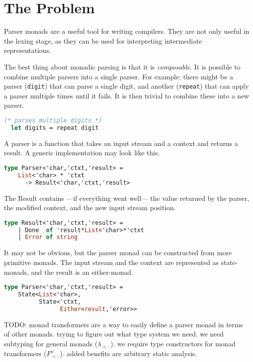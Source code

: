 \section{The Problem}
\begin{multicols}{2}
  Parser monads are a useful tool for writing compilers.
  They are not only useful in the lexing stage,
  as they can be used for interpreting intermediate representations.

  The best thing about monadic parsing is that it is \textit{composable}.
  It is possible to combine multiple parsers into a single parser.
  For example: there might be a parser (\texttt{digit}) that can parse a single digit,
  and another (\texttt{repeat}) that can apply a parser multiple times until it fails.
  It is then trivial to combine these into a new parser.
  \begin{lstlisting}[language=Caml]
  (* parses multiple digits *)
  let digits = repeat digit
  \end{lstlisting} 

  A parser is a function that takes an input stream and a context and returns a result.
  A generic implementation may look like this.
  \begin{lstlisting}[language=Caml]
  type Parser<'char,'ctxt,'result> =
    List<'char> * 'ctxt
      -> Result<'char,'ctxt,'result>
  \end{lstlisting}
  
  The Result contains ---if everything went well--- the value returned by the parser, the modified context, and the new input stream position.
  \begin{lstlisting}[language=Caml]
  type Result<'char,'ctxt,'result> = 
    | Done  of 'result*List<'char>*'ctxt
    | Error of string
  \end{lstlisting}

  It may not be obvious, but the parser monad can be constructed from more primitive monads.
  The input stream and the context are represented as state-monads, and the result is an either-monad.
  \begin{lstlisting}[language=Caml]
  type Parser<'char,'ctxt,'result> =
    State<List<'char>,
          State<'ctxt,
                Either<result,'error>>
  \end{lstlisting}

  
  
  TODO:
  monad transformers are a way to easily define a parser monad in terms of other monads.
  trying to figure out what type system we need.
  we need subtyping for general monads ($\lambda_{<:}$).
  we require type constructors for monad transformers ($F^\omega_{<:}$).
  added benefits are arbitrary static analysis.
\end{multicols}
\pagebreak
